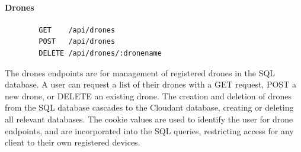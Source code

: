 \documentclass{article}
\begin{document}
\paragraph{Drones}
\begin{center}
	\begin{lstlisting}
		GET    /api/drones
		POST   /api/drones
		DELETE /api/drones/:dronename
	\end{lstlisting}
\end{center}
The drones endpoints are for management of registered drones in the SQL database. A user can request a list of their drones with a GET request, POST a new drone, or DELETE an existing drone. The creation and deletion of drones from the SQL database cascades to the Cloudant database, creating or deleting all relevant databases. The cookie values are used to identify the user for drone endpoints, and are incorporated into the SQL queries, restricting access for any client to their own registered devices. 
\end{document}
